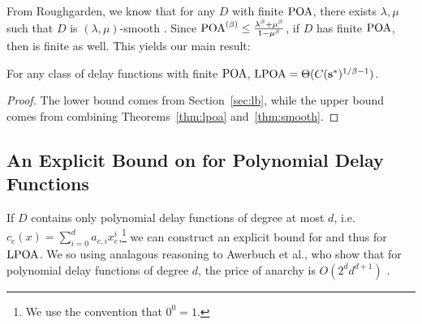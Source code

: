\documentclass[twoside]{article}
\begin{document}
\begin{multicols}{2}
From Roughgarden, we know that for any $D$ with finite $\text{POA}$, there exists
$\lambda,\mu$ such that $D$ is $(\lambda,\mu)$-smooth \cite{Roughgarden2012}.
Since $\text{POA}^{(\beta)} \le \frac{\lambda^\beta + \mu^\beta}{1-\mu^\beta}$, if $D$ has
finite $\text{POA}$, then \poab is finite as well. This yields our main result:
\begin{thm} \label{thm:main}
 For any class of delay functions with finite $\text{POA}$, $\text{LPOA} =
 \Theta(C(\mathbf{s}^*)^{1/\beta-1})$.
\end{thm}
\begin{proof}
  The lower bound comes from Section~\ref{sec:lb}, while the upper bound comes
  from combining Theorems~\ref{thm:lpoa} and~\ref{thm:smooth}.
\end{proof}

\subsection{An Explicit Bound on \poab for Polynomial Delay Functions}
If $D$ contains only polynomial delay functions of degree at most $d$, i.e.
$c_e(x) = \sum_{i=0}^d a_{e,i} x_e^i$,\footnote{We use the convention that $0^0
= 1$.} we can construct an explicit bound for \poab and thus for $\text{LPOA}$. We
so using analagous reasoning to Awerbuch et al., who show that for polynomial
delay functions of degree $d$, the price of anarchy is $O(2^d d^{d+1})$
\cite{Awerbuch2005}.


\end{multicols}
\end{document}
